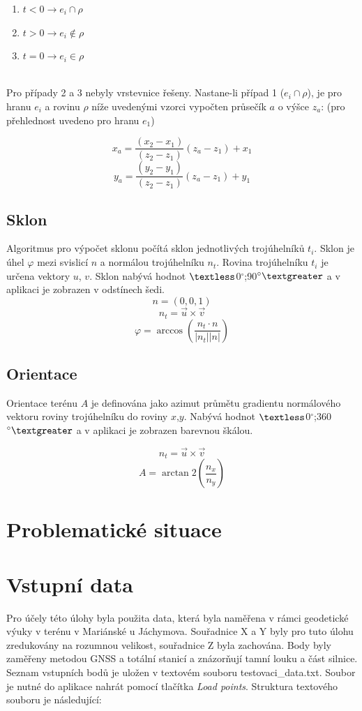 \documentclass[a4paper, 12pt]{article}
\begin{document}
\begin{enumerate}
\item $t < 0 \rightarrow e_i \cap \rho$
\item $t > 0 \rightarrow e_i \notin \rho$ 
\item $t = 0 \rightarrow e_i \in \rho$
\end{enumerate}
~\\
Pro případy 2 a 3 nebyly vrstevnice řešeny. Nastane-li případ 1 ($e_i \cap \rho$), je pro hranu $e_i$ a rovinu $\rho$ níže uvedenými vzorci vypočten průsečík $a$ o výšce $z_a$: (pro přehlednost uvedeno pro hranu $e_1$)

$$ x_a = \frac{(x_2-x_1)}{(z_2-z_1)}(z_a-z_1)+x_1 $$
$$ y_a = \frac{(y_2-y_1)}{(z_2-z_1)}(z_a-z_1)+y_1 $$

\subsection{Sklon}
Algoritmus pro výpočet sklonu počítá sklon jednotlivých trojúhelníků $t_i$. Sklon je úhel $\varphi$ mezi svislicí $n$ a normálou trojúhelníku $n_t$. Rovina trojúhelníku $t_i$ je určena vektory $u$, $v$. Sklon nabývá hodnot $\textless$0$^\circ$;90$^\circ\textgreater$ a v aplikaci je zobrazen v odstínech šedi.\\

$$n = (0,0,1)$$
$$n_t = \vec{u}\times \vec{v}$$
$$\varphi =\arccos\left(\frac{n_t \cdot n}{|n_t| |n|}\right)$$

\subsection{Orientace}
Orientace terénu $A$ je definována jako azimut průmětu gradientu normálového vektoru roviny trojúhelníku do roviny $x$,$y$. Nabývá hodnot $\textless$0$^\circ$;360$^\circ\textgreater$ a v aplikaci je zobrazen barevnou škálou.

$$n_t = \vec{u}\times \vec{v}$$
$$A = \arctan2\left(\frac{n_x}{n_y}\right)$$

\section{Problematické situace}

\section{Vstupní data}
Pro účely této úlohy byla použita data, která byla naměřena v rámci geodetické výuky v terénu v Mariánské u Jáchymova. Souřadnice X a Y byly pro tuto úlohu zredukovány na rozumnou velikost, souřadnice Z byla zachována. Body byly zaměřeny metodou GNSS a totální stanicí a znázorňují tamní louku a část silnice. Seznam vstupních bodů je uložen v textovém souboru testovaci\_data.txt. Soubor je nutné do aplikace nahrát pomocí tlačítka \textsl{Load points}. Struktura textového souboru je následující:\\
\end{document}
